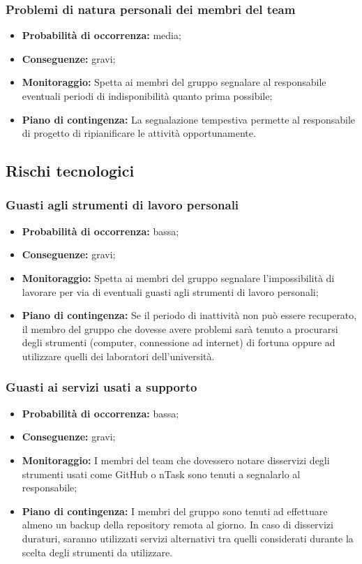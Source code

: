 \subsubsection{Problemi di natura personali dei membri del team}
\begin{itemize}
\item \textbf{Probabilità di occorrenza:} media;
\item \textbf{Conseguenze:} gravi;
\item \textbf{Monitoraggio:} Spetta ai membri del gruppo segnalare al responsabile eventuali periodi di indisponibilità quanto prima possibile;
\item \textbf{Piano di contingenza:} La segnalazione tempestiva permette al responsabile di progetto di ripianificare le attività opportunamente.
\end{itemize}
\subsection{Rischi tecnologici}
\subsubsection{Guasti agli strumenti di lavoro personali}
\begin{itemize}
\item \textbf{Probabilità di occorrenza:} bassa;
\item \textbf{Conseguenze:} gravi;
\item \textbf{Monitoraggio:} Spetta ai membri del gruppo segnalare l'impossibilità di lavorare per via	di eventuali guasti agli strumenti di lavoro personali;
\item \textbf{Piano di contingenza:} Se il periodo di inattività non può essere recuperato, il membro del gruppo che dovesse avere problemi sarà tenuto a procurarsi degli strumenti (computer, connessione ad internet) di fortuna oppure ad utilizzare quelli dei laboratori dell'università.
\end{itemize}
\subsubsection{Guasti ai servizi usati a supporto}
\begin{itemize}
\item \textbf{Probabilità di occorrenza:} bassa;
\item \textbf{Conseguenze:} gravi;
\item \textbf{Monitoraggio:} I membri del team che dovessero notare disservizi degli strumenti usati come GitHub o nTask sono tenuti a segnalarlo al responsabile;
\item \textbf{Piano di contingenza:} I membri del gruppo sono tenuti ad effettuare almeno un backup della repository remota al giorno. In caso di disservizi duraturi, saranno utilizzati servizi alternativi tra quelli considerati	durante la scelta degli strumenti da utilizzare.
\end{itemize}
